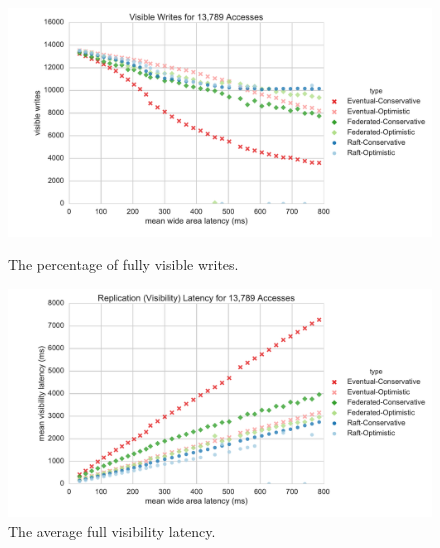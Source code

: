 \documentclass[10pt,conference,letterpaper]{IEEEtran}
\begin{document}
\begin{figure}
    \centering
      \includegraphics[width=\linewidth]{figures/latency/visible_writes}
      \caption{The percentage of fully visible writes.}\label{fig:visible_writes}
    \endminipage\hfill
      \includegraphics[width=\linewidth]{figures/latency/visibility_latency}
      \caption{The average full visibility latency.}\label{fig:visibility_latency}
    \endminipage\hfill
\end{figure}
\end{document}
